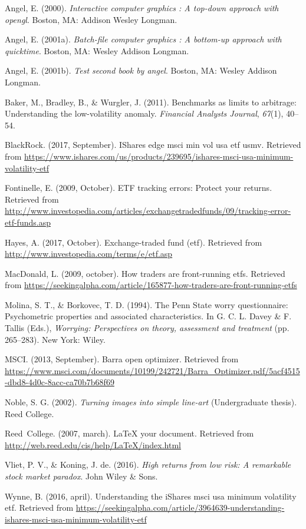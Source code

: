 \documentclass[12pt,twoside]{reedthesis}
\theoremstyle{definition}
\theoremstyle{definition}
\theoremstyle{definition}
\theoremstyle{remark}
\begin{document}
\hypertarget{refs}{}
\hypertarget{ref-angel2000}{}
Angel, E. (2000). \emph{Interactive computer graphics : A top-down
approach with opengl}. Boston, MA: Addison Wesley Longman.

\hypertarget{ref-angel2001}{}
Angel, E. (2001a). \emph{Batch-file computer graphics : A bottom-up
approach with quicktime}. Boston, MA: Wesley Addison Longman.

\hypertarget{ref-angel2002a}{}
Angel, E. (2001b). \emph{Test second book by angel}. Boston, MA: Wesley
Addison Longman.

\hypertarget{ref-baker2011}{}
Baker, M., Bradley, B., \& Wurgler, J. (2011). Benchmarks as limits to
arbitrage: Understanding the low-volatility anomaly. \emph{Financial
Analysts Journal}, \emph{67}(1), 40--54.

\hypertarget{ref-blackrock2017}{}
BlackRock. (2017, September). IShares edge msci min vol usa etf
\textbar{} usmv. Retrieved from
\url{https://www.ishares.com/us/products/239695/ishares-msci-usa-minimum-volatility-etf}

\hypertarget{ref-fontinelle2009}{}
Fontinelle, E. (2009, October). ETF tracking errors: Protect your
returns. Retrieved from
\url{http://www.investopedia.com/articles/exchangetradedfunds/09/tracking-error-etf-funds.asp}

\hypertarget{ref-hayes2017}{}
Hayes, A. (2017, October). Exchange-traded fund (etf). Retrieved from
\url{http://www.investopedia.com/terms/e/etf.asp}

\hypertarget{ref-macdonald2009}{}
MacDonald, L. (2009, october). How traders are front-running etfs.
Retrieved from
\url{https://seekingalpha.com/article/165877-how-traders-are-front-running-etfs}

\hypertarget{ref-Molina1994}{}
Molina, S. T., \& Borkovec, T. D. (1994). The Penn State worry
questionnaire: Psychometric properties and associated characteristics.
In G. C. L. Davey \& F. Tallis (Eds.), \emph{Worrying: Perspectives on
theory, assessment and treatment} (pp. 265--283). New York: Wiley.

\hypertarget{ref-msci2013}{}
MSCI. (2013, September). Barra open optimizer. Retrieved from
\url{https://www.msci.com/documents/10199/242721/Barra_Optimizer.pdf/5acf4515-dbd8-4d0c-8acc-ca70b7b68f69}

\hypertarget{ref-noble2002}{}
Noble, S. G. (2002). \emph{Turning images into simple line-art}
(Undergraduate thesis). Reed College.

\hypertarget{ref-reedweb2007}{}
Reed~College. (2007, march). LaTeX your document. Retrieved from
\url{http://web.reed.edu/cis/help/LaTeX/index.html}

\hypertarget{ref-van2016}{}
Vliet, P. V., \& Koning, J. de. (2016). \emph{High returns from low
risk: A remarkable stock market paradox}. John Wiley \& Sons.

\hypertarget{ref-wynne2016}{}
Wynne, B. (2016, april). Understanding the iShares msci usa minimum
volatility etf. Retrieved from
\url{https://seekingalpha.com/article/3964639-understanding-ishares-msci-usa-minimum-volatility-etf}


\end{document}
